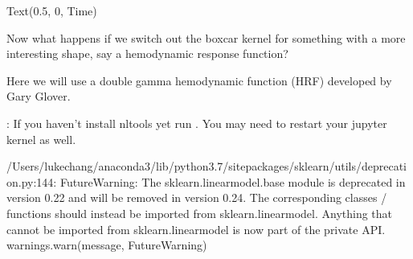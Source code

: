 \documentclass[letterpaper,10pt,english]{sphinxmanual}
\begin{document}
\begin{sphinxVerbatim}[commandchars=\\\{\}]
Text(0.5, 0, \PYGZsq{}Time\PYGZsq{})
\end{sphinxVerbatim}

\noindent{}

Now what happens if we switch out the boxcar kernel for something with a more interesting shape, say a hemodynamic response function?

Here we will use a double gamma hemodynamic function (HRF) developed by Gary Glover.

: If you haven’t install nltools yet run .  You may need to restart your jupyter kernel as well.

\begin{sphinxVerbatim}[commandchars=\\\{\}]
   

  
   
  
 
 
 
\end{sphinxVerbatim}

\begin{sphinxVerbatim}[commandchars=\\\{\}]
/Users/lukechang/anaconda3/lib/python3.7/site\PYGZhy{}packages/sklearn/utils/deprecation.py:144: FutureWarning: The sklearn.linear\PYGZus{}model.base module is  deprecated in version 0.22 and will be removed in version 0.24. The corresponding classes / functions should instead be imported from sklearn.linear\PYGZus{}model. Anything that cannot be imported from sklearn.linear\PYGZus{}model is now part of the private API.
  warnings.warn(message, FutureWarning)
\end{sphinxVerbatim}
\end{document}
